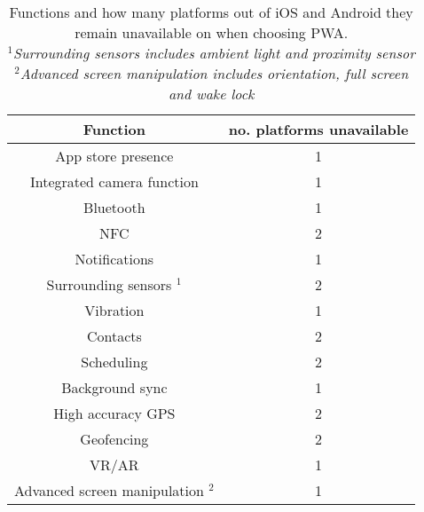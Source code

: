 














\begin{table}[ht]
    \centering
    \begin{tabular}{ |c|c| }
        \hline
        \rowcolor{light-gray}
        Function & no. platforms unavailable\\
        \hline
        App store presence & 1 \\ 
        \hline
        Integrated camera function & 1 \\ 
        \hline
        Bluetooth & 1 \\ 
        \hline
        NFC & 2 \\
        \hline
        Notifications & 1 \\
        \hline
        Surrounding sensors $^1$  & 2 \\
        \hline
        Vibration & 1 \\
        \hline
        Contacts & 2 \\
        \hline
        Scheduling & 2 \\
        \hline
        Background sync & 1 \\
        \hline
        High accuracy GPS & 2 \\
        \hline
        Geofencing & 2 \\
        \hline
        VR/AR & 1 \\
        \hline
        Advanced screen manipulation $^2$  & 1 \\
        \hline 

    \end{tabular}
    \caption{\label{tab:model-func-unavail}Functions and how many platforms out of iOS and Android they remain unavailable on when choosing PWA. \\
    \textit{$^1$Surrounding sensors includes ambient light and proximity sensor}\\
    \textit{$^2$Advanced screen manipulation includes orientation, full screen and wake lock}
    } 
\end{table}